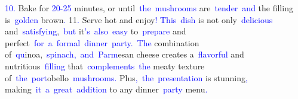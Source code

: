\documentclass{article}
\begin{document}
\begin{tcolorbox}[colframe=black,colback=white]
{}\textcolor{blue}{10}\textcolor{blue}{.} Bake for \textcolor{blue}{20}\textcolor{blue}{-}\textcolor{blue}{25} minutes, or until\textcolor{blue}{~the}\textcolor{blue}{~mushrooms} are\textcolor{blue}{~tender}\textcolor{blue}{~and} the filling is\textcolor{blue}{~golden} brown\textcolor{blue}{.
}11\textcolor{blue}{.} Serve hot and enjoy\textcolor{blue}{!
}\textcolor{blue}{This}\textcolor{blue}{~dish} is not only\textcolor{blue}{~delicious} and\textcolor{blue}{~satisfying},\textcolor{blue}{~but} it\textcolor{blue}{'s}\textcolor{blue}{~also}\textcolor{blue}{~easy} to\textcolor{blue}{~prepare} and perfect\textcolor{blue}{~for}\textcolor{blue}{~a}\textcolor{blue}{~formal}\textcolor{blue}{~dinner}\textcolor{blue}{~party}\textcolor{blue}{.}\textcolor{blue}{~The} combination of\textcolor{blue}{~qu}inoa,\textcolor{blue}{~spinach}\textcolor{blue}{,}\textcolor{blue}{~and}\textcolor{blue}{~Parm}esan cheese creates a\textcolor{blue}{~flavorful} and nutritious\textcolor{blue}{~filling} that\textcolor{blue}{~comple}\textcolor{blue}{ments}\textcolor{blue}{~the} meaty texture of\textcolor{blue}{~the}\textcolor{blue}{~port}obello\textcolor{blue}{~mushrooms}\textcolor{blue}{.} Plus\textcolor{blue}{,}\textcolor{blue}{~the}\textcolor{blue}{~presentation} is stunning\textcolor{blue}{,} making\textcolor{blue}{~it}\textcolor{blue}{~a}\textcolor{blue}{~great}\textcolor{blue}{~addition} to any dinner\textcolor{blue}{~party} menu\textcolor{blue}{.}\textcolor{blue}{}
\end{tcolorbox}
\end{document}
